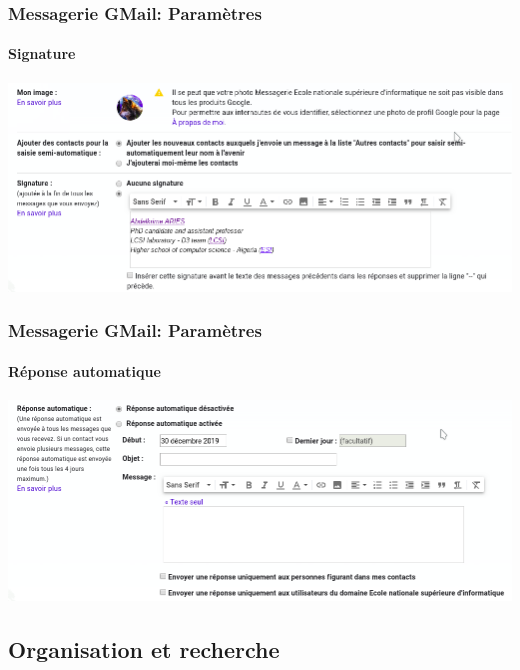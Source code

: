 \documentclass{beamer}
\begin{document}
\begin{frame}
\frametitle{Messagerie GMail: Paramètres}
\framesubtitle{Signature}

\includegraphics[width=.60\textwidth]{..//img/Bweb02-ri-gmail/gmail-parametre-signature.png}

\end{frame}

\begin{frame}
\frametitle{Messagerie GMail: Paramètres}
\framesubtitle{Réponse automatique}

\includegraphics[width=.60\textwidth]{..//img/Bweb02-ri-gmail/gmail-parametre-reponse.png}

\end{frame}

\subsection{Organisation et recherche}
\end{document}
